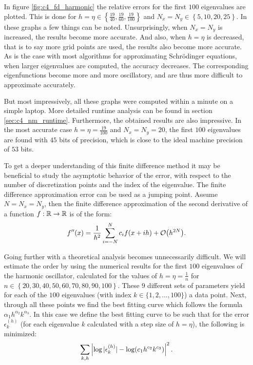 In figure \ref{fig:c4_fd_harmonic} the relative errors for the first $100$ eigenvalues are plotted. This is done for $h = \eta \in \left\{\frac{19}{40}, \frac{19}{60}, \frac{19}{100}\right\}$ and $N_x = N_y \in \left\{ 5, 10, 20, 25 \right\}$. In these graphs a few things can be noted. Unsurprisingly, when $N_x = N_y$ is increased, the results become more accurate. And also, when $h = \eta$ is decreased, that is to say more grid points are used, the results also become more accurate. As is the case with most algorithms for approximating Schrödinger equations, when larger eigenvalues are computed, the accuracy decreases. The corresponding eigenfunctions become more and more oscillatory, and are thus more difficult to approximate accurately.

But most impressively, all these graphs were computed within a minute on a simple laptop. More detailed runtime analysis can be found in section \ref{sec:c4_nm_runtime}. Furthermore, the obtained results are also impressive. In the most accurate case $h= \eta = \frac{19}{100}$ and $N_x = N_y = 20$, the first $100$ eigenvalues are found with $45$ bits of precision, which is close to the ideal machine precision of $53$ bits.

To get a deeper understanding of this finite difference method it may be beneficial to study the asymptotic behavior of the error, with respect to the number of discretization points and the index of the eigenvalue. The finite difference approximation error can be used as a jumping point. Assume $N = N_x = N_y$, then the finite difference approximation of the second derivative of a function $f : \mathbb{R} \to \mathbb{R}$ is of the form:
$$
    f''(x) = \frac{1}{h^2}\sum_{i=-N}^{N} c_{i} f(x + i h) + \OO\mleft(h^{2N}\mright)\text{.}
$$

Going further with a theoretical analysis becomes unnecessarily difficult. We will estimate the order by using the numerical results for the first $100$ eigenvalues of the harmonic oscillator, calculated for the values of $h = \eta = \frac{1}{n}$ for $n \in \left\{20, 30, 40, 50, 60, 70, 80, 90, 100\right\}$. These $9$ different sets of parameters yield for each of the $100$ eigenvalues (with index $k \in \{1, 2, \dots, 100\}$) a data point. Next, through all these points we find the best fitting curve which follows the formula $\alpha_1 h^{\alpha_2} k^{\alpha_3}$. In this case we define the best fitting curve to be such that for the error $\epsilon_k^{(h)}$ (for each eigenvalue $k$ calculated with a step size of $h = \eta$), the following is minimized:
$$
    \sum_{k, h}\left|\log|\epsilon_{k}^{(h)}| - \log\mleft(c_1 h^{c_2} k^{c_3}\mright)\right|^2 \text{.}
$$

